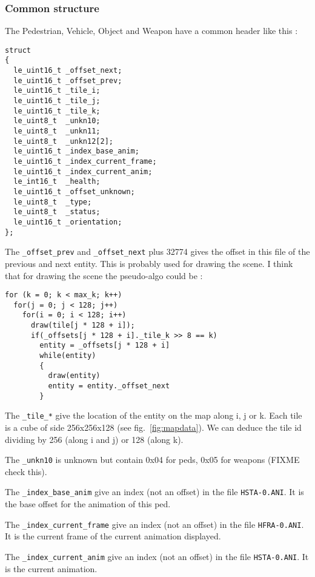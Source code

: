 \documentclass[a4paper,twoside,12pt,dvips]{article}
\begin{document}
\subsubsection{Common structure}
\label{sec:game_common}

The Pedestrian, Vehicle, Object and Weapon have a common header like this :

\begin{lstlisting}
struct
{
  le_uint16_t _offset_next;
  le_uint16_t _offset_prev;
  le_uint16_t _tile_i;
  le_uint16_t _tile_j;
  le_uint16_t _tile_k;
  le_uint8_t  _unkn10;
  le_uint8_t  _unkn11;
  le_uint8_t  _unkn12[2];
  le_uint16_t _index_base_anim;
  le_uint16_t _index_current_frame;
  le_uint16_t _index_current_anim;
  le_int16_t  _health;
  le_uint16_t _offset_unknown;
  le_uint8_t  _type;
  le_uint8_t  _status;
  le_uint16_t _orientation;
};
\end{lstlisting}

The \texttt{\_offset\_prev} and \texttt{\_offset\_next} plus 32774 gives the offset in this file of the previous and next entity. This is probably used for drawing the scene. I think that for drawing the scene the pseudo-algo could be :
\begin{lstlisting}
for (k = 0; k < max_k; k++)
  for(j = 0; j < 128; j++)
    for(i = 0; i < 128; i++)
      draw(tile[j * 128 + i]);
      if(_offsets[j * 128 + i]._tile_k >> 8 == k)
        entity = _offsets[j * 128 + i]
        while(entity)
        {
          draw(entity)
          entity = entity._offset_next
        }
\end{lstlisting}


The \texttt{\_tile\_*} give the location of the entity on the map along i, j or k. Each tile is a cube of side 256x256x128 (see fig.~\ref{fig:mapdata}). We can deduce the tile id dividing by 256 (along i and j) or 128 (along k).

The \texttt{\_unkn10} is unknown but contain 0x04 for peds, 0x05 for weapons (FIXME check this).

The \texttt{\_index\_base\_anim} give an index (not an offset) in the file \texttt{HSTA-0.ANI}. It is the base offset for the animation of this ped.

The \texttt{\_index\_current\_frame} give an index (not an offset) in the file \texttt{HFRA-0.ANI}. It is the current frame of the current animation displayed.

The \texttt{\_index\_current\_anim} give an index (not an offset) in the file \texttt{HSTA-0.ANI}. It is the current animation.
\end{document}
